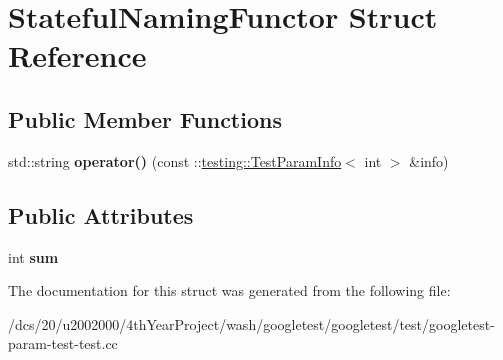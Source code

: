 \hypertarget{structStatefulNamingFunctor}{}\section{Stateful\+Naming\+Functor Struct Reference}
\label{structStatefulNamingFunctor}
\subsection*{Public Member Functions}
\begin{DoxyCompactItemize}
\item 
\mbox{\label{structStatefulNamingFunctor_a6a1d07c0b8314c1aee535f269ea536db}} 
std\+::string {\bfseries operator()} (const \+::\mbox{\hyperlink{structtesting_1_1TestParamInfo}{testing\+::\+Test\+Param\+Info}}$<$ int $>$ \&info)
\end{DoxyCompactItemize}
\subsection*{Public Attributes}
\begin{DoxyCompactItemize}
\item 
\mbox{\label{structStatefulNamingFunctor_a95887cf031d3113ae2edcd7617af3b79}} 
int {\bfseries sum}
\end{DoxyCompactItemize}


The documentation for this struct was generated from the following file\+:\begin{DoxyCompactItemize}
\item 
/dcs/20/u2002000/4th\+Year\+Project/wash/googletest/googletest/test/googletest-\/param-\/test-\/test.\+cc\end{DoxyCompactItemize}
